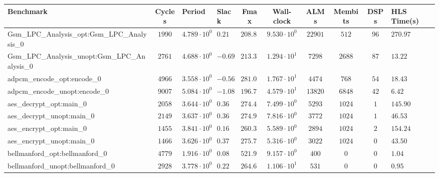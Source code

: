 \begin{tabular}{|l|c|HHc|c|c|c|cH|}
\hline
Benchmark                                       & Cycles       & Period                 & Slack     & Fmax       & Wall-clock              & ALMs       & Membits     & DSPs    & HLS Time(s) \\
\hline
Gsm\_LPC\_Analysis\_opt:Gsm\_LPC\_Analysis\_0   & $ 1990     $ & $ 4.789 \cdot 10^{0} $ & $ 0.21  $ & $ 208.81 $ & $ 9.530 \cdot 10^{0}  $ & $ 22901  $ & $ 512     $ & $ 96  $ & $ 270.97  $ \\
Gsm\_LPC\_Analysis\_unopt:Gsm\_LPC\_Analysis\_0 & $ 2761     $ & $ 4.688 \cdot 10^{0} $ & $ -0.69 $ & $ 213.31 $ & $ 1.294 \cdot 10^{1}  $ & $ 7298   $ & $ 2688    $ & $ 87  $ & $ 13.22   $ \\
adpcm\_encode\_opt:encode\_0                    & $ 4966     $ & $ 3.558 \cdot 10^{0} $ & $ -0.56 $ & $ 281.06 $ & $ 1.767 \cdot 10^{1}  $ & $ 4474   $ & $ 768     $ & $ 54  $ & $ 18.43   $ \\
adpcm\_encode\_unopt:encode\_0                  & $ 9007     $ & $ 5.084 \cdot 10^{0} $ & $ -1.08 $ & $ 196.70 $ & $ 4.579 \cdot 10^{1}  $ & $ 13820  $ & $ 6848    $ & $ 42  $ & $ 6.42    $ \\
aes\_decrypt\_opt:main\_0                       & $ 2058     $ & $ 3.644 \cdot 10^{0} $ & $ 0.36  $ & $ 274.42 $ & $ 7.499 \cdot 10^{0}  $ & $ 5293   $ & $ 1024    $ & $ 1   $ & $ 145.90  $ \\
aes\_decrypt\_unopt:main\_0                     & $ 2149     $ & $ 3.637 \cdot 10^{0} $ & $ 0.36  $ & $ 274.95 $ & $ 7.816 \cdot 10^{0}  $ & $ 3772   $ & $ 1024    $ & $ 1   $ & $ 46.53   $ \\
aes\_encrypt\_opt:main\_0                       & $ 1455     $ & $ 3.841 \cdot 10^{0} $ & $ 0.16  $ & $ 260.35 $ & $ 5.589 \cdot 10^{0}  $ & $ 2894   $ & $ 1024    $ & $ 2   $ & $ 154.24  $ \\
aes\_encrypt\_unopt:main\_0                     & $ 1466     $ & $ 3.626 \cdot 10^{0} $ & $ 0.37  $ & $ 275.79 $ & $ 5.316 \cdot 10^{0}  $ & $ 3022   $ & $ 1024    $ & $ 0   $ & $ 43.50   $ \\
bellmanford\_opt:bellmanford\_0                 & $ 4779     $ & $ 1.916 \cdot 10^{0} $ & $ 0.08  $ & $ 521.92 $ & $ 9.157 \cdot 10^{0}  $ & $ 400    $ & $ 0       $ & $ 0   $ & $ 1.04    $ \\
bellmanford\_unopt:bellmanford\_0               & $ 2928     $ & $ 3.778 \cdot 10^{0} $ & $ 0.22  $ & $ 264.69 $ & $ 1.106 \cdot 10^{1}  $ & $ 531    $ & $ 0       $ & $ 0   $ & $ 0.95    $ \\

\end{tabular}
